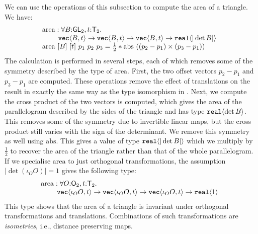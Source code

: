 \begin{example}\label{ex:area-of-triangle-1}
  We can use the operations of this subsection to
  compute the area of a triangle. We have:
  \begin{displaymath}
    \begin{array}{@{}l}
      \mathrm{area} : \forall B\mathord:\SynGL{2},
      t\mathord:\SynTransl{2}.\ \\
      \hspace{0.8cm}\tyPrim{vec}{B, t} \to \tyPrim{vec}{B, t} \to
      \tyPrim{vec}{B, t} \to \tyPrim{real}{|\det B|}
      \\ \mathrm{area}\ [B]\ [t]\ p_1\ p_2\ p_3 = \frac{1}{2} *
      \mathrm{abs}\ ((p_2 - p_1) \times (p_3 - p_1))
    \end{array}
  \end{displaymath}
  The calculation is performed in several steps, each of which removes
  some of the symmetry described by the type of
  $\mathrm{area}$. First, the two offset vectors $p_2 - p_1$ and $p_3
  - p_1$ are computed. These operations remove the effect of
  translations on the result in exactly the same way as the type
  isomorphism in . Next, we compute the cross
  product of the two vectors is computed, which gives the area of the
  parallelogram described by the sides of the triangle and has type
  $\textup{\texttt{real}}\langle \det B \rangle$. This removes some of the symmetry due to
  invertible linear maps, but the cross product still varies with the
  sign of the determinant. We remove this symmetry as well using
  $\mathrm{abs}$. This gives a value of type $\textup{\texttt{real}}\langle |\det B| \rangle$
  which we multiply by $\frac{1}{2}$ to recover the area of the
  triangle rather than that of the whole parallelogram. If we
  specialise $\mathrm{area}$ to just orthogonal transformations, the
  assumption $|\det (\iota_OO)| = 1$ gives the following type:
  \begin{displaymath}
    \begin{array}{@{}l}
      \mathrm{area} : \forall O\mathord:\SynOrth{2},
      t\mathord:\SynTransl{2}.\ \\
      \hspace{0.8cm}\tyPrim{vec}{\iota_OO, t} \to
      \tyPrim{vec}{\iota_OO, t} \to \tyPrim{vec}{\iota_OO, t} \to
      \tyPrim{real}{1}
    \end{array}
  \end{displaymath}
  This type shows that the area of a triangle is invariant under
  orthogonal transformations and translations. Combinations of such
  transformations are {\em isometries}, i.e., distance preserving
  maps.
\end{example}

